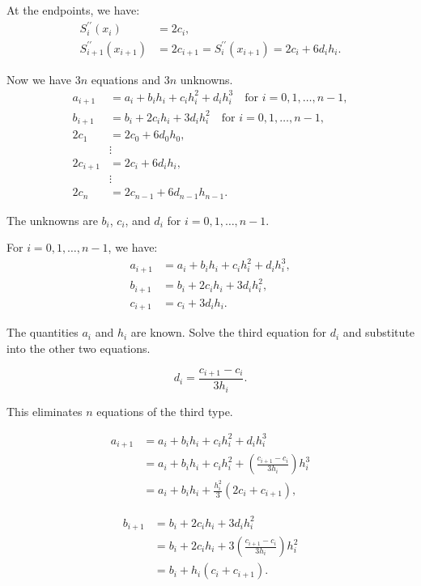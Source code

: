\documentclass[a4paper]{article}
\begin{document}
\begin{sloppypar}
At the endpoints, we have:
$$\begin{aligned}
S_{i}^{\prime\prime}(x_{i}) &= 2c_{i}, \\
S_{i+1}^{\prime\prime}(x_{i+1}) &= 2c_{i+1} = S_{i}^{\prime\prime}(x_{i+1}) = 2c_{i} + 6d_{i}h_{i}.
\end{aligned}$$

Now we have $3n$ equations and $3n$ unknowns.
$$
\begin{aligned}
a_{i+1} &= a_{i} + b_{i}h_{i} + c_{i}h_{i}^{2} + d_{i}h_{i}^{3} \quad \text{for } i = 0, 1, \ldots, n-1, \\
b_{i+1} &= b_{i} + 2c_{i}h_{i} + 3d_{i}h_{i}^{2} \quad \text{for } i = 0, 1, \ldots, n-1, \\
2c_{1} &= 2c_{0} + 6d_{0}h_{0}, \\
&\vdots \\
2c_{i+1} &= 2c_{i} + 6d_{i}h_{i}, \\
&\vdots \\
2c_{n} &= 2c_{n-1} + 6d_{n-1}h_{n-1}.
\end{aligned}
$$

The unknowns are \(b_{i}\), \(c_{i}\), and \(d_{i}\) for \(i = 0, 1, \ldots, n-1\).

For \(i = 0, 1, \ldots, n-1\), we have:
$$\begin{aligned}
a_{i+1} &= a_{i} + b_{i}h_{i} + c_{i}h_{i}^{2} + d_{i}h_{i}^{3}, \\
b_{i+1} &= b_{i} + 2c_{i}h_{i} + 3d_{i}h_{i}^{2}, \\
c_{i+1} &= c_{i} + 3d_{i}h_{i}.
\end{aligned}$$

The quantities \(a_{i}\) and \(h_{i}\) are known. Solve the third equation for \(d_{i}\) and substitute into the other two equations.

\[ d_{i} = \frac{c_{i+1} - c_{i}}{3h_{i}}. \]

This eliminates \(n\) equations of the third type.

\[ 
\begin{aligned}
a_{i+1} &= a_{i} + b_{i}h_{i} + c_{i}h_{i}^{2} + d_{i}h_{i}^{3} \\
&= a_{i} + b_{i}h_{i} + c_{i}h_{i}^{2} + \left(\frac{c_{i+1} - c_{i}}{3h_{i}}\right)h_{i}^{3} \\
&= a_{i} + b_{i}h_{i} + \frac{h_{i}^{2}}{3}(2c_{i} + c_{i+1}),
\end{aligned}
\]

\[ 
\begin{aligned}
b_{i+1} &= b_{i} + 2c_{i}h_{i} + 3d_{i}h_{i}^{2} \\
&= b_{i} + 2c_{i}h_{i} + 3\left(\frac{c_{i+1} - c_{i}}{3h_{i}}\right)h_{i}^{2} \\
&= b_{i} + h_{i}(c_{i} + c_{i+1}).
\end{aligned}
\]


\end{sloppypar}
\end{document}
